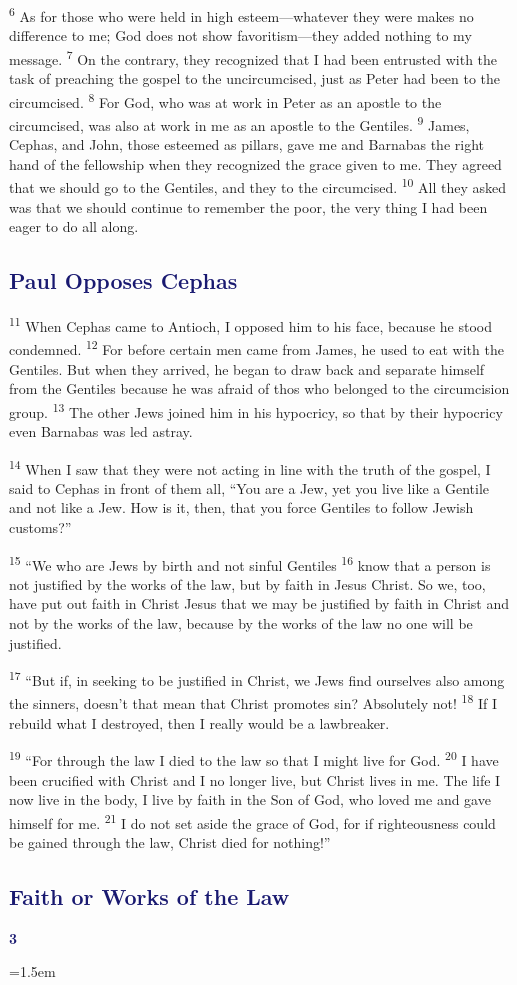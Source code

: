 \documentclass[12pt,twoside]{article}
\newcommand{\vs}[1]{\textsuperscript{#1}}
\newcommand{\chapterWithIndent}[2]{%
  \noindent
  \begin{minipage}[t]{1cm}
    \vspace{-0.4\baselineskip}
    {\textcolor{MidnightBlue}{\fontsize{40pt}{48pt}\selectfont \textbf{#1}}}
  \end{minipage}%
  \hspace{0.3cm}%
  \begin{minipage}[t]{\dimexpr\linewidth - 1.5cm - 0.3cm\relax}
    \hangindent=1.5em
    \hangafter=3
    #2
    \vspace{0.05cm}
  \end{minipage}
}
\begin{document}
\vs{6} As for those who were held in high esteem---whatever they were makes no difference to me; God does not show favoritism---they added nothing to my message.
\vs{7} On the contrary, they recognized that I had been entrusted with the task of preaching the gospel to the uncircumcised, just as Peter had been to the circumcised.
\vs{8} For God, who was at work in Peter as an apostle to the circumcised, was also at work in me as an apostle to the Gentiles.
\vs{9} James, Cephas, and John, those esteemed as pillars, gave me and Barnabas the right hand of the fellowship when they recognized the grace given to me. They agreed that we should go to the Gentiles, and they to the circumcised.
\vs{10} All they asked was that we should continue to remember the poor, the very thing I had been eager to do all along.

\subsection*{\textcolor{MidnightBlue}{\textbf{Paul Opposes Cephas}}}

\hspace{0.5cm} \vs{11} When Cephas came to Antioch, I opposed him to his face, because he stood condemned.
\vs{12} For before certain men came from James, he used to eat with the Gentiles. But when they arrived, he began to draw back and separate himself from the Gentiles because he was afraid of thos who belonged to the circumcision group.
\vs{13} The other Jews joined him in his hypocricy, so that by their hypocricy even Barnabas was led astray.

\vs{14} When I saw that they were not acting in line with the truth of the gospel, I said to Cephas in front of them all, ``You are a Jew, yet you live like a Gentile and not like a Jew. How is it, then, that you force Gentiles to follow Jewish customs?''

\vs{15} ``We who are Jews by birth and not sinful Gentiles
\vs{16} know that a person is not justified by the works of the law, but by faith in Jesus Christ. So we, too, have put out faith in Christ Jesus that we may be justified by faith in Christ and not by the works of the law, because by the works of the law no one will be justified.

\vs{17} ``But if, in seeking to be justified in Christ, we Jews find ourselves also among the sinners, doesn't that mean that Christ promotes sin? Absolutely not!
\vs{18} If I rebuild what I destroyed, then I really would be a lawbreaker.

\vs{19} ``For through the law I died to the law so that I might live for God.
\vs{20} I have been crucified with Christ and I no longer live, but Christ lives in me. The life I now live in the body, I live by faith in the Son of God, who loved me and gave himself for me.
\vs{21} I do not set aside the grace of God, for if righteousness could be gained through the law, Christ died for nothing!''

\subsection*{\textcolor{MidnightBlue}{\textbf{Faith or Works of the Law}}}

\chapterWithIndent{3}{}
\end{document}
